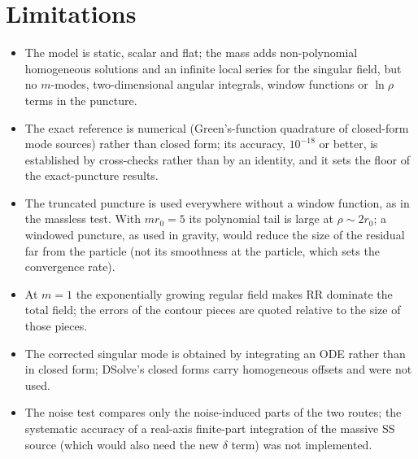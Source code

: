 \documentclass[11pt,a4paper]{article}
\begin{document}
\section{Limitations}\label{sec:limits}
\begin{itemize}[leftmargin=*]
\item The model is static, scalar and flat; the mass adds non-polynomial homogeneous solutions and an infinite local series for the singular field, but no $m$-modes, two-dimensional angular integrals, window functions or $\ln\rho$ terms in the puncture.
\item The exact reference is numerical (Green's-function quadrature of closed-form mode sources) rather than closed form; its accuracy, $10^{-18}$ or better, is established by cross-checks rather than by an identity, and it sets the floor of the exact-puncture results.
\item The truncated puncture is used everywhere without a window function, as in the massless test. With $mr_0=5$ its polynomial tail is large at $\rho\sim2r_0$; a windowed puncture, as used in gravity, would reduce the size of the residual far from the particle (not its smoothness at the particle, which sets the convergence rate).
\item At $m=1$ the exponentially growing regular field makes RR dominate the total field; the errors of the contour pieces are quoted relative to the size of those pieces.
\item The corrected singular mode is obtained by integrating an ODE rather than in closed form; DSolve's closed forms carry homogeneous offsets and were not used.
\item The noise test compares only the noise-induced parts of the two routes; the systematic accuracy of a real-axis finite-part integration of the massive SS source (which would also need the new $\delta$ term) was not implemented.
\end{itemize}
\end{document}
